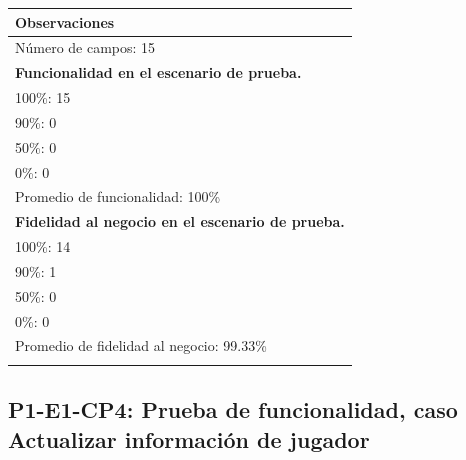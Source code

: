 \documentclass[oneside,10pt]{book}
\begin{document}
\begin{tabularx}{\textwidth}{ X }
\multicolumn{1}{X}{\cellcolor[HTML]{9B9B9B}\textbf{Observaciones}} \\ \hline
\multicolumn{1}{|l|}{Número de campos: 15 }	\\
\multicolumn{1}{|l|}{\textbf{Funcionalidad en el escenario de prueba.} }	\\
\multicolumn{1}{|l|}{100\%: 15 }	\\
\multicolumn{1}{|l|}{90\%: 0 }	\\
\multicolumn{1}{|l|}{50\%: 0 }	\\
\multicolumn{1}{|l|}{0\%: 0 }	\\
\multicolumn{1}{|l|}{Promedio de funcionalidad: 100\% }	\\
\multicolumn{1}{|l|}{\textbf{Fidelidad al negocio en el escenario de prueba.} }	\\
\multicolumn{1}{|l|}{100\%: 14 }	\\
\multicolumn{1}{|l|}{90\%: 1 }	\\
\multicolumn{1}{|l|}{50\%: 0 }	\\
\multicolumn{1}{|l|}{0\%: 0 }	\\
\multicolumn{1}{|l|}{Promedio de fidelidad al negocio: 99.33\% }	\\
\multicolumn{1}{|l|}{ }	\\ \hline
\end{tabularx}
\newpage
\subsection{P1-E1-CP4: Prueba de funcionalidad, caso Actualizar información de jugador}
\end{document}
